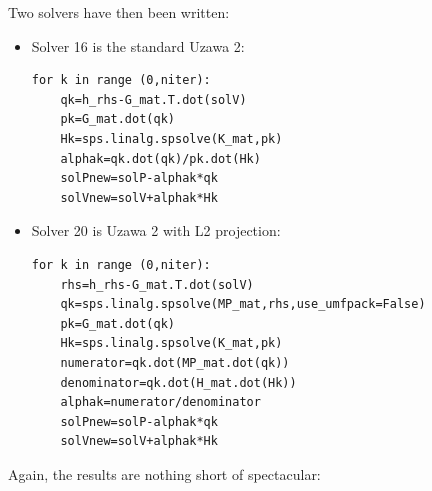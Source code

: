 Two solvers have then been written:
\begin{itemize}
\item Solver 16 is the standard Uzawa 2:
\begin{lstlisting}
for k in range (0,niter): 
    qk=h_rhs-G_mat.T.dot(solV)      
    pk=G_mat.dot(qk)               
    Hk=sps.linalg.spsolve(K_mat,pk) 
    alphak=qk.dot(qk)/pk.dot(Hk)   
    solPnew=solP-alphak*qk        
    solVnew=solV+alphak*Hk       
\end{lstlisting}

\item Solver 20 is Uzawa 2 with L2 projection: 
\begin{lstlisting}
for k in range (0,niter): 
    rhs=h_rhs-G_mat.T.dot(solV)
    qk=sps.linalg.spsolve(MP_mat,rhs,use_umfpack=False)    
    pk=G_mat.dot(qk)                           
    Hk=sps.linalg.spsolve(K_mat,pk)             
    numerator=qk.dot(MP_mat.dot(qk))             
    denominator=qk.dot(H_mat.dot(Hk))             
    alphak=numerator/denominator                   
    solPnew=solP-alphak*qk                          
    solVnew=solV+alphak*Hk                           
\end{lstlisting}

\end{itemize}





Again, the results are nothing short of spectacular:

